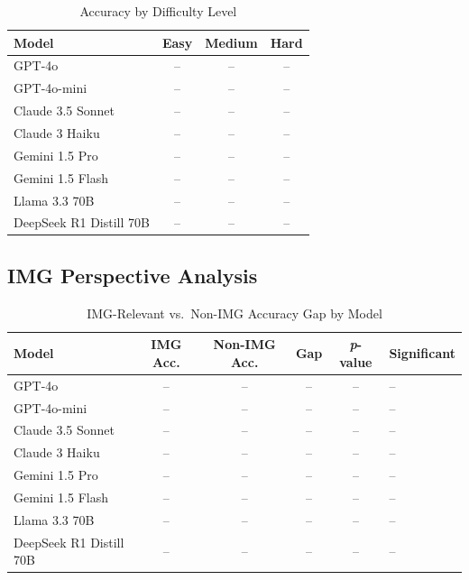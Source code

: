 \begin{table}[htbp]
\centering
\caption{Accuracy by Difficulty Level}
\label{tab:accuracy_by_difficulty}
\begin{tabular}{lccc}
\toprule
Model & Easy & Medium & Hard \\
\midrule
GPT-4o & -- & -- & -- \\
GPT-4o-mini & -- & -- & -- \\
Claude 3.5 Sonnet & -- & -- & -- \\
Claude 3 Haiku & -- & -- & -- \\
Gemini 1.5 Pro & -- & -- & -- \\
Gemini 1.5 Flash & -- & -- & -- \\
Llama 3.3 70B & -- & -- & -- \\
DeepSeek R1 Distill 70B & -- & -- & -- \\
\bottomrule
\end{tabular}
\end{table}

\subsection{IMG Perspective Analysis}


\begin{table}[htbp]
\centering
\caption{IMG-Relevant vs.\ Non-IMG Accuracy Gap by Model}
\label{tab:img_gap}
\begin{tabular}{lccccl}
\toprule
Model & IMG Acc. & Non-IMG Acc. & Gap & \textit{p}-value & Significant \\
\midrule
GPT-4o & -- & -- & -- & -- & -- \\
GPT-4o-mini & -- & -- & -- & -- & -- \\
Claude 3.5 Sonnet & -- & -- & -- & -- & -- \\
Claude 3 Haiku & -- & -- & -- & -- & -- \\
Gemini 1.5 Pro & -- & -- & -- & -- & -- \\
Gemini 1.5 Flash & -- & -- & -- & -- & -- \\
Llama 3.3 70B & -- & -- & -- & -- & -- \\
DeepSeek R1 Distill 70B & -- & -- & -- & -- & -- \\
\bottomrule
\end{tabular}
\end{table}

